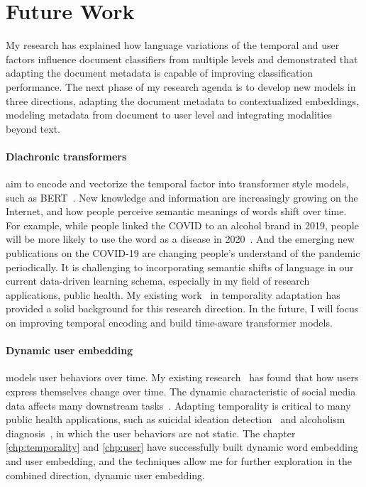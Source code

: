 \section{Future Work}

My research has explained how language variations of the temporal and user factors influence document classifiers from multiple levels and demonstrated that adapting the document metadata is capable of improving classification performance.
The next phase of my research agenda is to develop new models in three directions, adapting the document metadata to contextualized embeddings, modeling metadata from document to user level and integrating modalities beyond text.

\paragraph{Diachronic transformers}
aim to encode and vectorize the temporal factor into transformer style models, such as BERT~\cite{devlin2019bert}.
New knowledge and information are increasingly growing on the Internet, and how people perceive semantic meanings of words shift over time. 
For example, while people linked the COVID to an alcohol brand in 2019, people will be more likely to use the word as a disease in 2020~\cite{broniatowski2020covid}. 
And the emerging new publications on the COVID-19 are changing people's understand of the pandemic periodically.
It is challenging to incorporating semantic shifts of language in our current data-driven learning schema, especially in my field of research applications, public health. 
My existing work~\cite{huang2018examining, huang2018modeling, huang2019neural} in temporality adaptation has provided a solid background for this research direction.
In the future, I will focus on improving temporal encoding and build time-aware transformer models.


\paragraph{Dynamic user embedding}
models user behaviors over time. 
My existing research~\cite{huang2019neural} has found that how users express themselves change over time.
The dynamic characteristic of social media data affects many downstream tasks~\cite{pan2019social}. 
Adapting temporality is critical to many public health applications, such as suicidal ideation detection~\cite{huang2015topic, huang2017exploring} and alcoholism diagnosis~\cite{huang2018modeling}, in which the user behaviors are not static.
The chapter \ref{chp:temporality} and \ref{chp:user} have successfully built dynamic word embedding and user embedding, and the techniques allow me for further exploration in the combined direction, dynamic user embedding.

